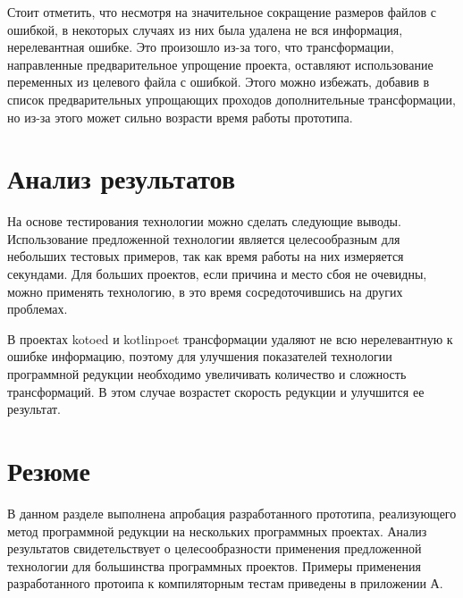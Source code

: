 Стоит отметить, что несмотря на значительное сокращение размеров файлов с ошибкой, в некоторых случаях из них была удалена не вся информация, нерелевантная ошибке. Это произошло из-за того, что трансформации, направленные предварительное упрощение проекта, оставляют использование переменных из целевого файла с ошибкой. Этого можно избежать, добавив в список предварительных упрощающих проходов дополнительные трансформации, но из-за этого может сильно возрасти время работы прототипа.


\section{Анализ результатов}
На основе тестирования технологии можно сделать следующие выводы. Использование предложенной технологии является целесообразным для небольших тестовых примеров, так как время работы на них измеряется секундами. Для больших проектов, если причина и место сбоя не очевидны, можно применять технологию, в это время сосредоточившись на других проблемах.

В проектах kotoed и kotlinpoet трансформации удаляют не всю нерелевантную к ошибке информацию, поэтому для улучшения показателей технологии программной редукции необходимо увеличивать количество и сложность трансформаций. В этом случае возрастет скорость редукции и улучшится ее результат.

\section{Резюме}
В данном разделе выполнена апробация разработанного прототипа, реализующего метод программной редукции на нескольких программных проектах.
Анализ результатов свидетельствует о целесообразности применения предложенной технологии для большинства программных проектов. Примеры применения разработанного протоипа к компиляторным тестам приведены в приложении А.